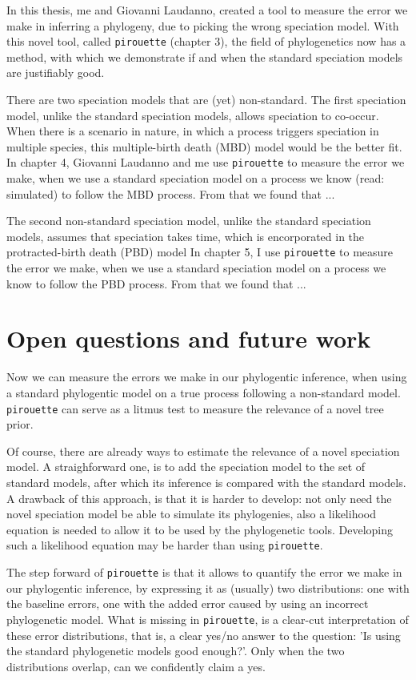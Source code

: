 In this thesis, me and Giovanni Laudanno, created a tool to
measure the error we make in inferring a phylogeny, due to
picking the wrong speciation model. 
With this novel tool, called \verb;pirouette; (chapter 3),
the field of phylogenetics now has a method, 
with which we demonstrate if and when the standard speciation models
are justifiably good.

There are two speciation models that are (yet) non-standard.
The first speciation model, 
unlike the standard speciation models, 
allows speciation to co-occur.
When there is a scenario in nature, in which a process triggers speciation
in multiple species, this multiple-birth death (MBD) model would be the better fit. 
In chapter 4, Giovanni Laudanno and me 
use \verb;pirouette; to 
measure the error we make, 
when we use a standard speciation model on a process we know (read: simulated) 
to follow the MBD process.
From that we found that ...

The second non-standard speciation model,
unlike the standard speciation models,
assumes that speciation takes time,
which is encorporated in the protracted-birth death (PBD) model
In chapter 5, I 
use \verb;pirouette; to 
measure the error we make, when we use a standard speciation
model on a process we know to follow the PBD process.
From that we found that ...

\section{Open questions and future work}

Now we can measure the errors we make in our phylogentic
inference, when using a standard phylogentic model on a
true process following a non-standard model. 
\verb;pirouette; can serve as a litmus test 
to measure the relevance of a novel tree prior. 

Of course, there are already ways to estimate the relevance of a
novel speciation model. A straighforward one, is to add the speciation
model to the set of standard models, after which its inference is
compared with the standard models. A drawback of this approach, is
that it is harder to develop: not only need the novel speciation model
be able to simulate its phylogenies, also a likelihood equation is needed
to allow it to be used by the phylogenetic tools. Developing such a
likelihood equation may be harder than using \verb;pirouette;.

The step forward of \verb;pirouette; is that it allows 
to quantify the error we make in our phylogentic inference, by
expressing it as (usually) two distributions: one with the baseline errors,
one with the added error caused by using an incorrect phylogenetic model.
What is missing in \verb;pirouette;, is a clear-cut interpretation of these 
error distributions, that is, a clear yes/no answer to the question: 'Is
using the standard phylogenetic models good enough?'. Only when the two
distributions overlap, can we confidently claim a yes. 


